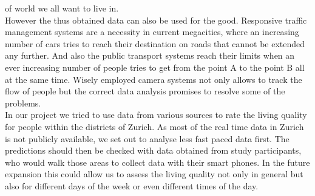 \documentclass[letterpaper]{article}
\begin{document}
of world we all want to live in.\\
\indent However the thus obtained data can also be used for the good. Responsive traffic management systems are a necessity in current 
megacities, where an increasing number of cars tries to reach their destination on roads that cannot be extended any further. 
And also the public transport systems reach their limits when an ever increasing number of people tries to get from the point A to the point B 
all at the same time. Wisely employed camera systems not only allows to track the flow of people but the correct data analysis promises to resolve 
some of the problems.\\
\indent In our project we tried to use data from various sources to rate the living quality for people within the districts of Zurich. 
As most of the real time data in Zurich is not publicly available, we set out to analyse less fast paced data first. The predictions 
should then be checked with data obtained from study participants, who would walk those areas to collect data with their smart phones. 
In the future expansion this could allow us to assess the living quality not only in general but also for different days of the week or even 
different times of the day.
\end{document}
